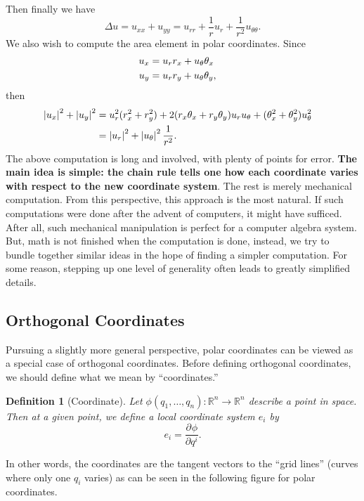 \documentclass[12pt,letterpaper,boxed]{jhwhw}
\newtheorem{definition}{Definition}
\newcommand*{\pd}[3][]{\ensuremath{\frac{\partial^{#1} #2}{\partial #3}}}
\newcommand{\R}{{\mathbb{R}}}
\newcommand{\abs}[1]{\left| #1 \right|}
\begin{document}
Then finally we have
\[
	\Delta u = u_{xx} + u_{yy} = u_{rr} + \frac{1}{r} u_r + \frac{1}{r^2} u_{\theta \theta}.
\]
We also wish to compute the area element in polar coordinates. Since
\[
	\begin{aligned}
		u_x &= u_r r_x + u_\theta \theta_x \cr
		u_y &= u_r r_y + u_\theta \theta_y,
	\end{aligned}
\]
then
\[
	\begin{aligned}
		\abs{u_x}^2 + \abs{u_y}^2 &= u_r^2(r_x^2 + r_y^2) + 2(r_x \theta_x + r_y \theta_y) u_r u_\theta + (\theta_x^2 + \theta_y^2) u_\theta^2 \cr
				       	&= \abs{u_r}^2 + \abs{u_\theta}^2 \frac{1}{r^2}.
	\end{aligned}
\]
The above computation is long and involved, with plenty of points for error. \textbf{The main idea is simple: the chain rule tells one how each coordinate varies with respect to the new coordinate system}. The rest is merely mechanical computation. From this perspective, this approach is the most natural. If such computations were done after the advent of computers, it might have sufficed. After all, such mechanical manipulation is perfect for a computer algebra system. But, math is not finished when the computation is done, instead, we try to bundle together similar ideas in the hope of finding a simpler computation. For some reason, stepping up one level of generality often leads to greatly simplified details.

\subsection{Orthogonal Coordinates}
Pursuing a slightly more general perspective, polar coordinates can be viewed as a special case of orthogonal coordinates. Before defining orthogonal coordinates, we should define what we mean by ``coordinates.'' 

\begin{definition}[Coordinate]
	Let $\phi(q_1, \ldots, q_n) : \R^n \to \R^n$ describe a point in space. Then at a given point, we define a local coordinate system $e_i$ by
	\[
		e_i = \pd{\phi}{q^i}.
	\]
\end{definition}
In other words, the coordinates are the tangent vectors to the ``grid lines'' (curves where only one $q_i$ varies) as can be seen in the following figure for polar coordinates.
\end{document}
